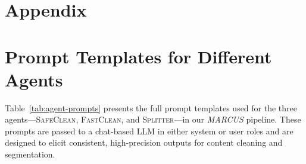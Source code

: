 \documentclass[11pt]{article}
\newcommand{\mymethod}{\emph{MARCUS}}
\begin{document}


% 


\clearpage 
\onecolumn
\appendix  
\section*{Appendix}


\section{Prompt Templates for Different Agents}
\label{app:prompts}

Table~\ref{tab:agent-prompts} presents the full prompt templates used for the three agents—\textsc{SafeClean}, \textsc{FastClean}, and \textsc{Splitter}—in our \mymethod{} pipeline. These prompts are passed to a chat-based LLM in either system or user roles and are designed to elicit consistent, high-precision outputs for content cleaning and segmentation.
\end{document}
